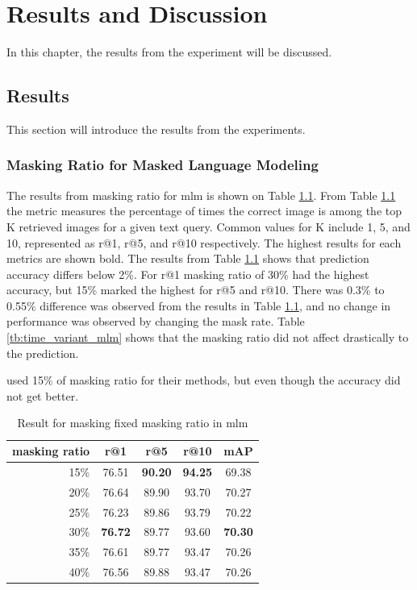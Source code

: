 

\chapter{Results and Discussion}
In this chapter, the results from the experiment will be discussed.

\section{Results}
This section will introduce the results from the experiments.

\subsection{Masking Ratio for Masked Language Modeling}
The results from masking ratio for \acrshort{mlm} is shown on Table \ref{tb:fixed_mlm}. From Table \ref{tb:fixed_mlm} the metric measures the percentage of times the correct image is among the top K retrieved images for a given text query. Common values for K include 1, 5, and 10, represented as r@1, r@5, and r@10 respectively. The highest results for each metrics are shown bold.
The results from Table \ref{tb:fixed_mlm} shows that prediction accuracy differs below 2\%. For r@1 masking ratio of 30\% had the highest accuracy, but 15\% marked the highest for r@5 and r@10. There was 0.3\% to 0.55\% difference was observed from the results in Table \ref{tb:fixed_mlm}, and no change in performance was observed by changing the mask rate.
Table \ref{tb:time_variant_mlm} shows that the masking ratio did not affect drastically to the prediction. 

\cite{Bai2023RaSaRA} used 15\% of masking ratio for their methods, but even though the accuracy did not get better.

\begin{table}[htbp]
    \centering
    \caption{Result for masking fixed masking ratio in \acrshort{mlm}}
    \label{tb:fixed_mlm}
    
    \begin{tabular}{rcccc}
      masking ratio & r@1 & r@5 & r@10 & mAP\\ \hline
      15\% & 76.51 & \textbf{90.20} & \textbf{94.25} & 69.38 \\
      20\% & 76.64 & 89.90 & 93.70 & 70.27 \\
      25\% & 76.23 & 89.86 & 93.79 & 70.22 \\
      30\% & \textbf{76.72} & 89.77 & 93.60 & \textbf{70.30} \\
      35\% & 76.61 & 89.77 & 93.47 & 70.26 \\
      40\% & 76.56 & 89.88 & 93.47 & 70.26
    \end{tabular}
\end{table}

